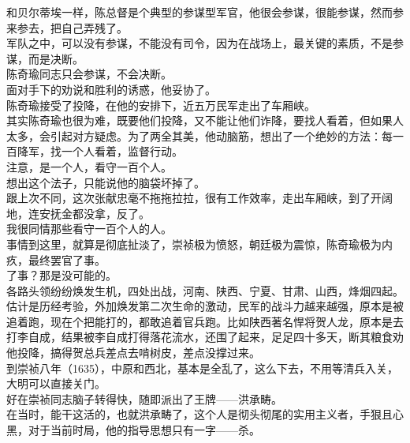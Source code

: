 \begin{multicols}{\theparacolNo}
和贝尔蒂埃一样，陈总督是个典型的参谋型军官，他很会参谋，很能参谋，然而参来参去，把自己弄残了。\\

军队之中，可以没有参谋，不能没有司令，因为在战场上，最关键的素质，不是参谋，而是决断。\\

陈奇瑜同志只会参谋，不会决断。\\

面对手下的劝说和胜利的诱惑，他妥协了。\\

陈奇瑜接受了投降，在他的安排下，近五万民军走出了车厢峡。\\

其实陈奇瑜也很为难，既要他们投降，又不能让他们诈降，要找人看着，但如果人太多，会引起对方疑虑。为了两全其美，他动脑筋，想出了一个绝妙的方法：每一百降军，找一个人看着，监督行动。\\

注意，是一个人，看守一百个人。\\

想出这个法子，只能说他的脑袋坏掉了。\\

跟上次不同，这次张献忠毫不拖拖拉拉，很有工作效率，走出车厢峡，到了开阔地，连安抚金都没拿，反了。\\

我很同情那些看守一百个人的人。\\

事情到这里，就算是彻底扯淡了，崇祯极为愤怒，朝廷极为震惊，陈奇瑜极为内疚，最终罢官了事。\\

了事？那是没可能的。\\

各路头领纷纷焕发生机，四处出战，河南、陕西、宁夏、甘肃、山西，烽烟四起。\\

估计是历经考验，外加焕发第二次生命的激动，民军的战斗力越来越强，原本是被追着跑，现在个把能打的，都敢追着官兵跑。比如陕西著名悍将贺人龙，原本是去打李自成，结果被李自成打得落花流水，还围了起来，足足四十多天，断其粮食劝他投降，搞得贺总兵差点去啃树皮，差点没撑过来。\\

到崇祯八年（1635），中原和西北，基本是全乱了，这么下去，不用等清兵入关，大明可以直接关门。\\

好在崇祯同志脑子转得快，随即派出了王牌——洪承畴。\\

在当时，能干这活的，也就洪承畴了，这个人是彻头彻尾的实用主义者，手狠且心黑，对于当前时局，他的指导思想只有一字——杀。\\


\end{multicols}
